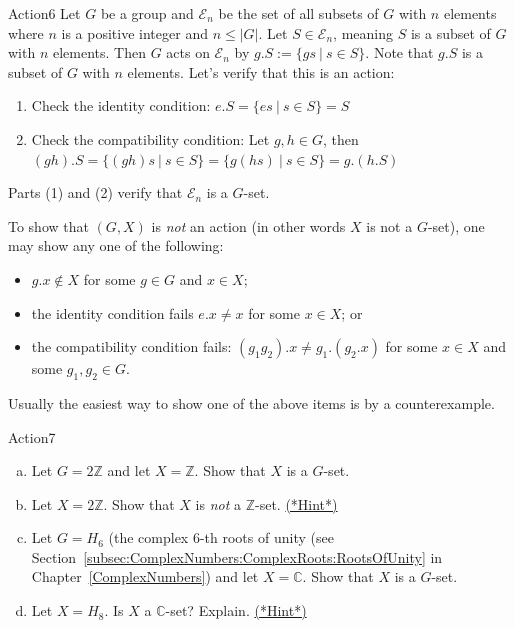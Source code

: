 \begin{example}{Action6}
Let $G$ be a group and $\mathcal{E}_n$ be the set of all subsets of $G$ with $n$ elements where $n$ is a positive integer and $n\leq |G|$. Let $S \in \mathcal{E}_n$, meaning $S$ is a subset of $G$ with $n$ elements. Then $G$ acts on $\mathcal{E}_n$ by $g.S:=\{gs~|~s \in S\}$. Note that $g.S$ is a subset of $G$ with $n$ elements. Let's verify that this is an action:
\begin{enumerate}[(1)]
\item Check the identity condition: $e.S=\{es~|~s \in S\}=S$
\item Check the compatibility condition: Let $g,h \in G$, then $(gh).S=\{(gh)s~|~s \in S\}=\{g(hs)~|~s \in S\}=g.(h.S)$
\end{enumerate}
Parts (1) and (2) verify that $\mathcal{E}_n$ is a $G$-set.
\end{example}

To show that $(G,X)$ is \emph{not} an action (in other words $X$ is not a $G$-set), one may show any one of the following:
\begin{itemize}
\item $g.x \notin X$ for some $g \in G$ and $x \in X$;
\item the identity condition fails $e.x \neq x$ for some $x\in X$; or
\item the compatibility condition fails: $(g_1g_2).x \neq g_1.(g_2.x)$ for some $x\in X$ and some $g_1, g_2 \in G$.
\end{itemize}
Usually the easiest way to show one of the above items is by a counterexample.

\begin{exercise}{Action7}
\begin{enumerate}[(a)]
\item 
Let $G = 2\mathbb{Z}$ and let $X =\mathbb{Z}$. Show that $X$ is a $G$-set.
\item Let $X = 2\mathbb{Z}$. Show that $X$ is \emph{not} a $\mathbb{Z}$-set.
\hyperref[sec:GroupActions:Hints]{(*Hint*)}
\item Let $G = H_6$ (the complex $6$-th roots of unity (see Section~\ref{subsec:ComplexNumbers:ComplexRoots:RootsOfUnity} in Chapter~\ref{ComplexNumbers}) and let $X =\mathbb{C}$. Show that $X$ is a $G$-set.
\item Let $X = H_8$.  Is $X$ a $\mathbb{C}$-set? Explain.
\hyperref[sec:GroupActions:Hints]{(*Hint*)}
\end{enumerate}
\end{exercise}

